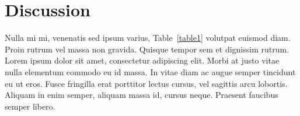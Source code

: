 \documentclass[10pt,letterpaper]{article}
\begin{document}


\section*{Discussion}
Nulla mi mi, venenatis sed ipsum varius, Table~\ref{table1} volutpat euismod diam. Proin rutrum vel massa non gravida. Quisque tempor sem et dignissim rutrum. Lorem ipsum dolor sit amet, consectetur adipiscing elit. Morbi at justo vitae nulla elementum commodo eu id massa. In vitae diam ac augue semper tincidunt eu ut eros. Fusce fringilla erat porttitor lectus cursus, vel sagittis arcu lobortis. Aliquam in enim semper, aliquam massa id, cursus neque. Praesent faucibus semper libero.
\end{document}
